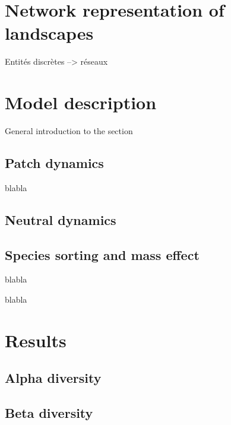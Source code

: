 \documentclass[12pt]{article}
\begin{document}
\section{Network representation of landscapes}

Entités discrètes --> réseaux

 


 

\section{Model description}

General introduction to the section

\subsection{Patch dynamics}
blabla

\subsection{Neutral dynamics}

\subsection{Species sorting and mass effect}
blabla

blabla

\section{Results}

\subsection{Alpha diversity}

\subsection{Beta diversity} 
\end{document}
